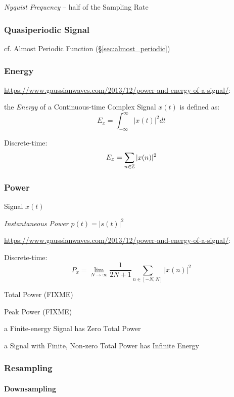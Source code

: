 \emph{Nyquist Frequency} -- half of the Sampling Rate



\subsubsection{Quasiperiodic Signal}\label{sec:quasiperiodic_signal}

cf. Almost Periodic Function (\S\ref{sec:almost_periodic})



\subsubsection{Energy}\label{sec:energy}

\url{https://www.gaussianwaves.com/2013/12/power-and-energy-of-a-signal/}:

the \emph{Energy} of a Continuous-time Complex Signal $x(t)$ is defined as:
\[
  E_x = \int_{-\infty}^\infty |x(t)|^2 dt
\]

Discrete-time:
\[
  E_x = \sum_{n \in \mathbb{Z}} |x(n)|^2
\]



\subsubsection{Power}\label{sec:signal_power}

Signal $x(t)$

\emph{Instantaneous Power} $p(t) = |s(t)|^2$

\url{https://www.gaussianwaves.com/2013/12/power-and-energy-of-a-signal/}:

Discrete-time:
\[
  P_x = \lim_{N\to\infty} \frac{1}{2N+1} \sum_{n \in [-N,N]}|x(n)|^2
\]

Total Power (FIXME)

Peak Power (FIXME)

a Finite-energy Signal has Zero Total Power

a Signal with Finite, Non-zero Total Power has Infinite Energy



\subsubsection{Resampling}\label{sec:resampling}

\paragraph{Downsampling}\label{sec:downsampling}\hfill

